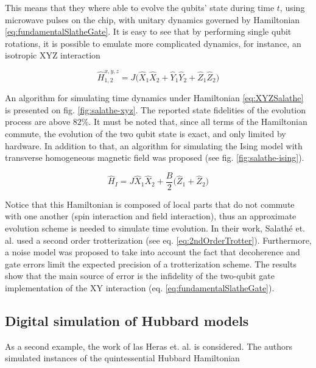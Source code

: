   This means that they where able to evolve the qubits' state during time $t$, using microwave pulses on the chip, with unitary dynamics governed by Hamiltonian \ref{eq:fundamentalSlatheGate}. It is easy to see that by performing single qubit rotations, it is possible to emulate more complicated dynamics, for instance, an isotropic XYZ interaction

  \begin{equation}
    \hat{H}_{1,2}^{x,y,z} = J \bigg( \hat{X}_1 \hat{X}_2 + \hat{Y}_1 \hat{Y}_2 + \hat{Z}_1 \hat{Z}_2 \bigg)
    \label{eq:XYZSalathe}
  \end{equation}

  An algorithm for simulating time dynamics under Hamiltonian \ref{eq:XYZSalathe} is presented on fig. \ref{fig:salathe-xyz}. The reported state fidelities of the evolution process are above $82\%$. It must be noted that, since all terms of the Hamiltonian commute, the evolution of the two qubit state is exact, and only limited by hardware. In addition to that, an algorithm for simulating the Ising model with transverse homogeneous magnetic field was proposed (see fig. \ref{fig:salathe-ising}).
  
  \begin{equation}
    \hat{H}_I = J \hat{X}_1 \hat{X}_2 + \frac{B}{2}\bigg(\hat{Z}_1 + \hat{Z}_2 \bigg)
    \label{eq:IsingSlathe}
  \end{equation}

  Notice that this Hamiltonian is composed of local parts that do not commute with one another (spin interaction and field interaction), thus an approximate evolution scheme is needed to simulate time evolution. In their work, Salathé et. al. \cite{HeisenbergSimulLasHeras} used a second order trotterization (see eq. \ref{eq:2ndOrderTrotter}). Furthermore, a noise model was proposed to take into account the fact that decoherence and gate errors limit the expected precision of a trotterization scheme. The results show that the main source of error is the infidelity of the two-qubit gate implementation of the XY interaction (eq. \ref{eq:fundamentalSlatheGate}).

  \subsection{Digital simulation of Hubbard models}

  As a second example, the work of las Heras et. al. is considered\cite{HubbardSimulLasHeras}. The authors simulated instances of the quintessential Hubbard Hamiltonian

